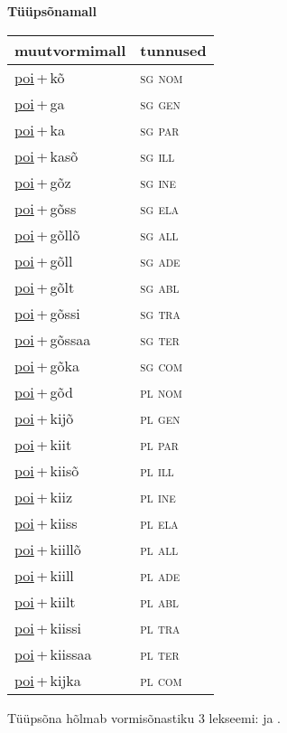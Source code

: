 
\vspace{1.8em}
\begin{minipage}{\textwidth}
\textbf{Tüüpsõnamall \,}\\

\begin{sideways}
\begin{tabular}{l l}
muutvormimall & tunnused \\
\hline
\underline{poi}\,+\,kõ & \textsc{ sg nom } \\
\underline{poi}\,+\,ga & \textsc{ sg gen } \\
\underline{poi}\,+\,ka & \textsc{ sg par } \\
\underline{poi}\,+\,kasõ & \textsc{ sg ill } \\
\underline{poi}\,+\,gõz & \textsc{ sg ine } \\
\underline{poi}\,+\,gõss & \textsc{ sg ela } \\
\underline{poi}\,+\,gõllõ & \textsc{ sg all } \\
\underline{poi}\,+\,gõll & \textsc{ sg ade } \\
\underline{poi}\,+\,gõlt & \textsc{ sg abl } \\
\underline{poi}\,+\,gõssi & \textsc{ sg tra } \\
\underline{poi}\,+\,gõssaa & \textsc{ sg ter } \\
\underline{poi}\,+\,gõka & \textsc{ sg com } \\
\underline{poi}\,+\,gõd & \textsc{ pl nom } \\
\underline{poi}\,+\,kijõ & \textsc{ pl gen } \\
\underline{poi}\,+\,kiit & \textsc{ pl par } \\
\underline{poi}\,+\,kiisõ & \textsc{ pl ill } \\
\underline{poi}\,+\,kiiz & \textsc{ pl ine } \\
\underline{poi}\,+\,kiiss & \textsc{ pl ela } \\
\underline{poi}\,+\,kiillõ & \textsc{ pl all } \\
\underline{poi}\,+\,kiill & \textsc{ pl ade } \\
\underline{poi}\,+\,kiilt & \textsc{ pl abl } \\
\underline{poi}\,+\,kiissi & \textsc{ pl tra } \\
\underline{poi}\,+\,kiissaa & \textsc{ pl ter } \\
\underline{poi}\,+\,kijka & \textsc{ pl com } \\
\end{tabular}
\end{sideways}
\label{tab:tüüpsõnamall-poikõ}

\end{minipage}

 
\vspace{1em}
\noindent Tüüpsõna hõlmab vormisõnastiku 3 lekseemi:  ja .
